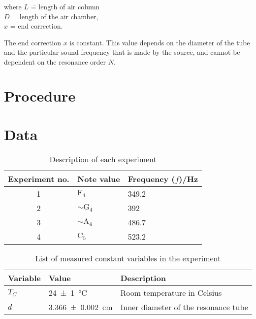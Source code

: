 \documentclass{article}
\numberwithin{equation}{section}
\begin{document}
\begin{tabbing}
  where \= \(L\) \= = length of air column \\
  \> \(D\) \> = length of the air chamber, \\
  \> \(x\) \> = end correction.
\end{tabbing}

The end correction \(x\) is constant. This value depends on the diameter of the tube and the particular sound frequency that is made by the source, and cannot be dependent on the resonance order \(N\).

\section{Procedure}

\section{Data}
\begin{table}[!h]
  \centering
  \begin{tabular}{|c|l|l|}
    \hline
    Experiment no.  & Note value            & Frequency (\(f\))/\si{Hz} \\
    \hline
    1               & \(\mathrm{F}_4\)      & 349.2 \\
    2               & \(\sim \mathrm{G}_4\) & 392 \\
    3               & \(\sim \mathrm{A}_4\) & 486.7 \\
    4               & \(\mathrm{C}_5\)      & 523.2 \\
    \hline
  \end{tabular}
  \caption{Description of each experiment}
  \label{table:d1}
\end{table}

\begin{table}[!h]
  \centering
  \begin{tabular}{|l|l|l|}
    \hline
    Variable  & Value                       & Description\\
    \hline
    \(T_C\)   & \SI{24(1)}{\celsius}        & {Room temperature in Celsius}\\
    \(d\)     & \SI{3.366(2)}{\centi\metre} & {Inner diameter of the resonance tube}\\
    \hline
  \end{tabular}
  \caption{List of measured constant variables in the experiment}
  \label{table:d2}
\end{table}
\end{document}
